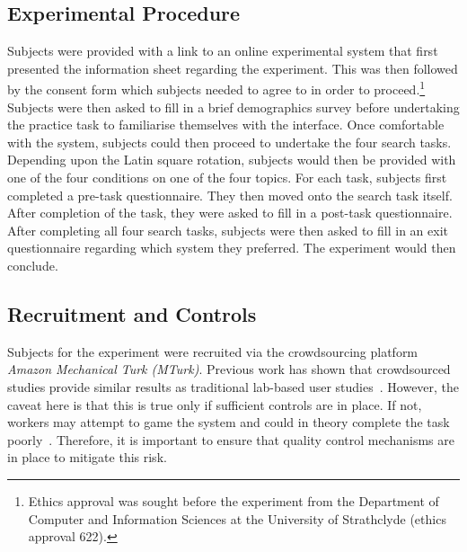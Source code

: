 \subsection{Experimental Procedure}
Subjects were provided with a link to an online experimental system that first presented the information sheet regarding the experiment. This was then followed by the consent form which subjects needed to agree to in order to proceed.\footnote{Ethics approval was sought before the experiment from the Department of Computer and Information Sciences at the University of Strathclyde (ethics approval 622).} Subjects were then asked to fill in a brief demographics survey before undertaking the practice task to familiarise themselves with the interface. Once comfortable with the system, subjects could then proceed to undertake the four search tasks. Depending upon the Latin square rotation, subjects would then be provided with one of the four conditions on one of the four topics. For each task, subjects first completed a pre-task questionnaire. They then moved onto the search task itself. After completion of the task, they were asked to fill in a post-task questionnaire. After completing all four search tasks, subjects were then asked to fill in an exit questionnaire regarding which system they preferred. The experiment would then conclude.



\subsection{Recruitment and Controls}\label{sec:method:subjects}
Subjects for the experiment were recruited via the crowdsourcing platform \emph{Amazon Mechanical Turk (MTurk)}. Previous work has shown that crowdsourced studies provide similar results as traditional lab-based user studies~\cite{kelly2011remote,zuccon2013crowdsourcing}. However, the caveat here is that this is true only if sufficient controls are in place. If not, workers may attempt to game the system and could in theory complete the task poorly~\cite{feild2010turkers}. Therefore, it is important to ensure that quality control mechanisms are in place to mitigate this risk.

